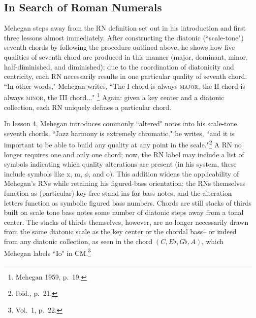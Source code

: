 \subsection{In Search of Roman Numerals}
Mehegan steps away from the RN definition set out in his introduction and first three lessons almost immediately.  After constructing the diatonic (``scale-tone") seventh chords by following the procedure outlined above, he shows how five qualities of seventh chord are produced in this manner (major, dominant, minor, half-diminished, and diminished); due to the coordination of diatonicity and centricity, each RN necessarily results in one particular quality of seventh chord.  ``In other words," Mehegan writes, ``The I chord is always \textsc{major}, the II chord is always \textsc{minor}, the III chord..." \footnote{Mehegan 1959, p.\ 19.}  Again: given a key center and a diatonic collection, each RN uniquely defines a particular chord.

In lesson 4, Mehegan introduces commonly ``altered" notes into his scale-tone seventh chords.  ``Jazz harmony is extremely chromatic," he writes, ``and it is important to be able to build any quality at any point in the scale."\footnote{Ibid., p.\ 21.}  A RN no longer requires one and only one chord; now, the RN label may include a list of symbols indicating which quality alterations are present (in his system, these include symbols like x, m, $\phi$, and o).  This addition widens the applicability of Mehegan's RNs while retaining his figured-bass orientation; the RNs themselves function as (particular) key-free stand-ins for bass notes, and the alteration letters function as symbolic figured bass numbers.  Chords are still stacks of thirds built on scale tone bass notes some number of diatonic steps away from a tonal center.  The stacks of thirds themselves, however, are no longer necessarily drawn from the same diatonic scale as the key center or the chordal bass-- or indeed from any diatonic collection, as seen in the chord $(C,E\flat,G\flat,A)$, which Mehegan labels ``Io" in CM.\footnote{Vol.\ 1, p.\ 22.}

